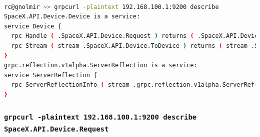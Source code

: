 \documentclass[IN,11pt,twoside,openright,bachelor,english]{tumthesis}
\begin{document}
\begin{lstlisting}[language=bash,basicstyle=\tiny]

rc@gnolmir ~> grpcurl -plaintext 192.168.100.1:9200 describe
SpaceX.API.Device.Device is a service:
service Device {
  rpc Handle ( .SpaceX.API.Device.Request ) returns ( .SpaceX.API.Device.Response );
  rpc Stream ( stream .SpaceX.API.Device.ToDevice ) returns ( stream .SpaceX.API.Device.FromDevice );
}
grpc.reflection.v1alpha.ServerReflection is a service:
service ServerReflection {
  rpc ServerReflectionInfo ( stream .grpc.reflection.v1alpha.ServerReflectionRequest ) returns ( stream .grpc.reflection.v1alpha.ServerReflectionResponse );
}
\end{lstlisting}
\subsubsection{\texttt{grpcurl -plaintext 192.168.100.1:9200 describe SpaceX.API.Device.Request}}
\end{document}
